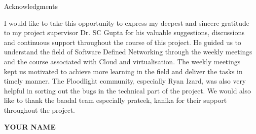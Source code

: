 \begin{center}
\LARGE{Acknowledgments} 
\end{center}

\vspace{0.5in}


I would like to take this opportunity to express my deepest and sincere gratitude to my project supervisor Dr. SC Gupta for his valuable suggestions, discussions and continuous support throughout the course of this project. He guided us to understand the field of Software Defined Networking through the weekly meetings and the course associated with Cloud and virtualisation. The weekly meetings kept us motivated to achieve more learning in the field and deliver the tasks in timely manner. The Floodlight community, especially Ryan Izard, was also very helpful in sorting out the bugs in the technical part of the project. We would also like to thank the baadal team especially prateek, kanika for their support throughout the project. 

\vspace{1.5in}

{\bfseries YOUR NAME}
